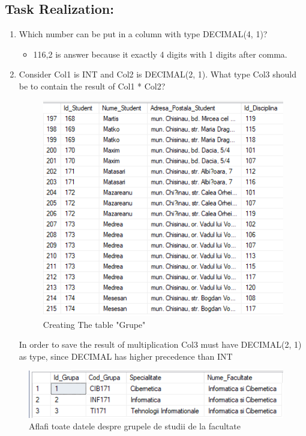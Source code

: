 \documentclass[12pt]{article}
\begin{document}
        \subsection*{Task Realization:}
        \begin{enumerate}
                \item  Which number can be put in a column with type DECIMAL(4, 1)?
                \begin{itemize}
                        \item 116,2 is answer because it exactly 4 digits with 1 digits after comma.
        
                \end{itemize}
                \item Consider Col1 is INT and Col2 is DECIMAL(2, 1). What type Col3 should be to contain the result of Col1 * Col2?
                \begin{figure}[H]
                        \centering
                        \includegraphics[width=.35\textwidth]{img9.png}
                        \caption{Creating The table "Grupe"}
                \end{figure}
                \vspace{0.5 cm}

                In order to save the result of multiplication Col3 must have DECIMAL(2, 1) as type, since DECIMAL has higher precedence than INT
        \end{enumerate}
       

        
        
        \begin{figure}[H]
                \centering
                \includegraphics[width=.95\textwidth]{img1.png}
                \caption{Aflafi toate datele despre grupele de studii de la facultate}
        \end{figure}
        \vspace{0.5 cm}
        
\end{document}
